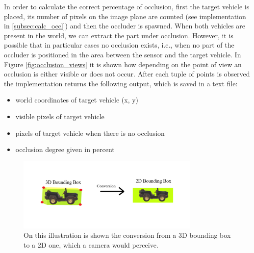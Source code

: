 In order to calculate the correct percentage of occlusion, first the target vehicle is placed, its number of pixels on the image plane are counted (see implementation in \ref{subsec:calc_occl}) and then the occluder is spawned. When both vehicles are present in the world, we can extract the part under occlusion. However, it is possible that in particular cases no occlusion exists, i.e., when no part of the occluder is positioned in the area between the sensor and the target vehicle. In Figure \ref{fig:occlusion_views} it is shown how depending on the point of view an occlusion is either visible or does not occur. After each tuple of points is observed the implementation returns the following output, which is saved in a text file:
\begin{itemize}
    \item world coordinates of target vehicle (x, y)
    \item visible pixels of target vehicle
    \item pixels of target vehicle when there is no occlusion
    \item occlusion degree given in percent
\end{itemize}

\begin{figure} [h!]
    \centering
    \includegraphics[width=0.8\textwidth]{images/2D_bounding_boxes.png}
    \caption[3D bounding box conversion]{On this illustration is shown the conversion from a 3D bounding box to a 2D one, which a camera would perceive.}
    \label{fig:bb_conversion}
\end{figure}

